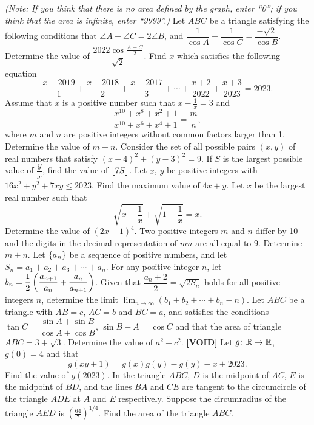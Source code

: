 \begin{enumerate}
    \textit{(Note: If you think that there is no area defined by the graph, enter ``0''; if you think that the area is infinite, enter ``9999''.)}
    \hyperrefitem[Q::2023-O-1-11] Let $ABC$ be a triangle satisfying the following conditions that $\angle A + \angle C = 2\angle B$, and $\dfrac1{\cos A} + \dfrac1{\cos C} = \dfrac{-\sqrt2}{\cos B}$. Determine the value of $\dfrac{2022\cos{\frac{A-C}{2}}}{\sqrt2}$.
    \hyperrefitem[Q::2023-O-1-12] Find $x$ which satisfies the following equation \[\dfrac{x-2019}{1} + \dfrac{x-2018}{2} + \dfrac{x-2017}{3} + \cdots + \dfrac{x+2}{2022} + \dfrac{x+3}{2023} = 2023.\]
    \hyperrefitem[Q::2023-O-1-13] Assume that $x$ is a positive number such that $x - \frac1x = 3$ and \[\dfrac{x^{10} + x^8 + x^2 + 1}{x^{10} + x^6 + x^4 + 1} = \dfrac{m}{n},\] where $m$ and $n$ are positive integers without common factors larger than 1. Determine the value of $m + n$.
    \hyperrefitem[Q::2023-O-1-14] Consider the set of all possible pairs $(x, y)$ of real numbers that satisfy $(x-4)^2 + (y-3)^2 = 9$. If $S$ is the largest possible value of $\dfrac{y}{x}$, find the value of $\left\lfloor 7S \right\rfloor$.
    \hyperrefitem[Q::2023-O-1-15] Let $x$, $y$ be positive integers with $16x^2 + y^2 + 7xy \leq 2023$. Find the maximum value of $4x + y$.
    \hyperrefitem[Q::2023-O-1-16] Let $x$ be the largest real number such that \[\sqrt{x - \dfrac1x} + \sqrt{1 - \dfrac1x} = x.\] Determine the value of $(2x-1)^4$.
    \hyperrefitem[Q::2023-O-1-17] Two positive integers $m$ and $n$ differ by 10 and the digits in the decimal representation of $mn$ are all equal to 9. Determine $m + n$.
    \hyperrefitem[Q::2023-O-1-18] Let $\left\lbrace a_n \right\rbrace$ be a sequence of positive numbers, and let $S_n = a_1 + a_2 + a_3 + \cdots + a_n$. For any positive integer $n$, let $b_n = \dfrac12 \left( \dfrac{a_{n+1}}{a_n} + \dfrac{a_n}{a_{n+1}} \right)$. Given that $\dfrac{a_n + 2}{2} = \sqrt{2S_n}$ holds for all positive integers $n$, determine the limit $\lim_{n \to \infty} (b_1 + b_2 + \cdots + b_n - n)$.
    \hyperrefitem[Q::2023-O-1-19] Let $ABC$ be a triangle with $AB = c$, $AC = b$ and $BC = a$, and satisfies the conditions $\tan C = \dfrac{\sin A + \sin B}{\cos A + \cos B}$, $\sin{B - A} = \cos C$ and that the area of triangle $ABC = 3 + \sqrt{3}$. Determine the value of $a^2 + c^2$.
    \hyperrefitem[Q::2023-O-1-20] \textbf{[VOID]} Let $g \colon \mathbb{R} \to \mathbb{R}$, $g(0) = 4$ and that \[g(xy + 1) = g(x)g(y) - g(y) - x + 2023.\] Find the value of $g(2023)$. 
    \hyperrefitem[Q::2023-O-1-21] In the triangle $ABC$, $D$ is the midpoint of $AC$, $E$ is the midpoint of $BD$, and the lines $BA$ and $CE$ are tangent to the circumcircle of the triangle $ADE$ at $A$ and $E$ respectively. Suppose the circumradius of the triangle $AED$ is $(\frac{64}{7})^{1/4}$. Find the area of the triangle $ABC$.

\end{enumerate}
